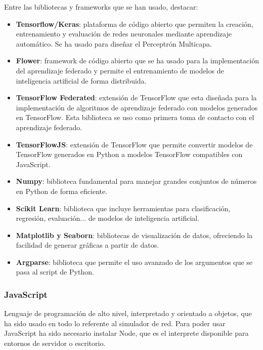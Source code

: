 Entre las bibliotecas y frameworks que se han usado, destacar:
\begin{itemize}
    \item \textbf{Tensorflow/Keras}: plataforma de código abierto que permiten la creación, entrenamiento y evaluación de redes neuronales mediante aprendizaje automático. Se ha usado para diseñar el Perceptrón Multicapa.
    \item \textbf{Flower}: framework de código abierto que se ha usado para la implementación del aprendizaje federado y permite el entrenamiento de modelos de inteligencia artificial de forma distribuida.
    \item \textbf{TensorFlow Federated}: extensión de TensorFlow que esta diseñada para la implementación de algoritmos de aprendizaje federado con modelos generados en TensorFlow. Esta biblioteca se uso como primera toma de contacto con el aprendizaje federado.
    \item \textbf{TensorFlowJS}: extensión de TensorFlow que permite convertir modelos de TensorFlow generados en Python a modelos TensorFlow compatibles con JavaScript.
    \item \textbf{Numpy}: biblioteca fundamental para manejar grandes conjuntos de números en Python de forma eficiente.
    \item \textbf{Scikit Learn}: biblioteca que incluye herramientas para clasificación, regresión, evaluación... de modelos de inteligencia artificial.
    \item \textbf{Matplotlib y Seaborn}: bibliotecas de visualización de datos, ofreciendo la facilidad de generar gráficas a partir de datos.
    \item \textbf{Argparse}: biblioteca que permite el uso avanzado de los argumentos que se pasa al script de Python.
\end{itemize}

\subsubsection{JavaScript}
\label{subsubsec:JavaScript}
Lenguaje de programación de alto nivel, interpretado y orientado a objetos, que ha sido usado en todo lo referente al simulador de red. Para poder usar JavaScript ha sido necesario instalar Node, que es el interprete disponible para entornos de servidor o escritorio.

